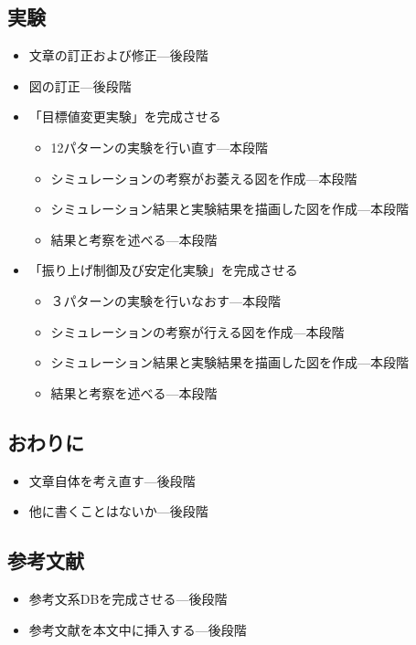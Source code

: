 	\subsection{実験}
		\begin{itemize}
		  \item 文章の訂正および修正---後段階
		  \item 図の訂正---後段階
		  \item 「目標値変更実験」を完成させる
		   \begin{itemize}
		     \item 12パターンの実験を行い直す---本段階
		     \item シミュレーションの考察がお萎える図を作成---本段階
		     \item シミュレーション結果と実験結果を描画した図を作成---本段階
		     \item 結果と考察を述べる---本段階
		  \end{itemize}
		  \item 「振り上げ制御及び安定化実験」を完成させる
		  	\begin{itemize}
		  	  \item ３パターンの実験を行いなおす---本段階
		  	  \item シミュレーションの考察が行える図を作成---本段階
		  	  \item シミュレーション結果と実験結果を描画した図を作成---本段階
		  	  \item 結果と考察を述べる---本段階
		  	\end{itemize}
		\end{itemize}
	\subsection{おわりに}
		\begin{itemize}
		  \item 文章自体を考え直す---後段階
		  \item 他に書くことはないか---後段階
		\end{itemize}
	\subsection{参考文献}
		\begin{itemize}
		  \item 参考文系DBを完成させる---後段階
		  \item 参考文献を本文中に挿入する---後段階
		\end{itemize}
